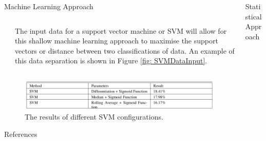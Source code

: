 \documentclass[final]{beamer}
\begin{document}
\begin{frame}{}
\begin{columns}[t]
\begin{column}{.48\linewidth}
\begin{block}{Machine Learning Approach}
\begin{columns}[t]
\begin{column}{0.48\linewidth}
         \end{column}
         
         \begin{column}{0.42\linewidth}
         
         The input data for a support vector machine or SVM will allow for this shallow machine learning approach to maximise the support vectors or distance between two classifications of data. An example of this data separation is shown in Figure \ref{fig: SVMDataInput}.
         
         \end{column}   
         
         \end{columns}
		
		\begin{figure}
         \includegraphics[width=0.8\columnwidth]{table3}
         \caption{The results of different SVM configurations.}
         \label{table: SVM Results}
         \end{figure}
		
		\end{block}


		\begin{block}{References}
		
		
		
		

		\nocite{*}
		
		\end{block}
        

      \end{column}


      \begin{column}{.48\linewidth}
        
        
         \begin{block}{Statistical Approach}
         
         \begin{columns}[t]
         

\end{columns}
\end{block}
\end{column}
\end{columns}
\end{frame}
\end{document}
